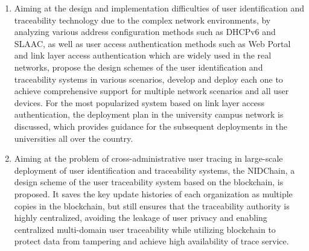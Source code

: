 \begin{abstract*}
\begin{enumerate}[1{)}]
    \item Aiming at the design and implementation difficulties of user identification and traceability technology due to the complex network environments, by analyzing various address configuration methods such as DHCPv6 and SLAAC, as well as user access authentication methods such as Web Portal and link layer access authentication which are widely used in the real networks, propose the design schemes of the user identification and traceability systems in various scenarios, develop and deploy each one to achieve comprehensive support for multiple network scenarios and all user devices. For the most popularized system based on link layer access authentication, the deployment plan in the university campus network is discussed, which provides guidance for the subsequent deployments in the universities all over the country.

    \item Aiming at the problem of cross-administrative user tracing in large-scale deployment of user identification and traceability systems, the NIDChain, a design scheme of the user traceability system based on the blockchain, is proposed. It saves the key update histories of each organization as multiple copies in the blockchain, but still ensures that the traceability authority is highly centralized, avoiding the leakage of user privacy and enabling centralized multi-domain user traceability while utilizing blockchain to protect data from tampering and achieve high availability of trace service.
  \end{enumerate}

\end{abstract*}
